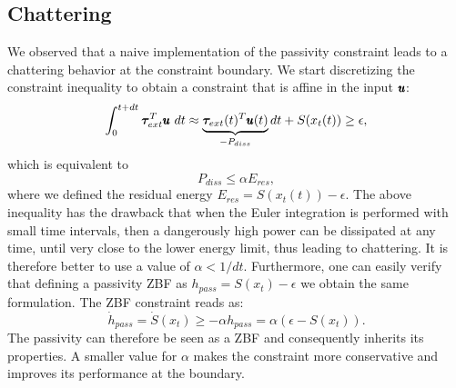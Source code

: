 \subsection{Chattering}
We observed that a naive implementation of the passivity constraint leads to a chattering behavior at the constraint boundary. We start discretizing the constraint inequality to obtain a constraint that is affine in the input $\pmb{u}$:
\begin{equation*}
    \int_{0}^{t + dt} \boldsymbol{\tau}_{ext}^T \pmb{u} \ dt \approx \underbrace{\boldsymbol{\tau}_{ext}(t)^T \pmb{u}(t) }_{-P_{diss}}dt + S(x_t(t)) \geq \epsilon,
\end{equation*}
which is equivalent to 
\begin{equation} \label{eq:passivity_simple}
    P_{diss} \leq \alpha E_{res},
\end{equation}
where we defined the residual energy $E_{res} = S(x_t(t))-\epsilon$. The above inequality has the drawback that when the Euler integration is performed with small time intervals, then a dangerously high power can be dissipated at any time, until very close to the lower energy limit, thus leading to chattering. It is therefore better to use a value of $\alpha < 1/dt$. Furthermore, one can easily verify that defining a passivity ZBF as $h_{pass} = S(x_t) - \epsilon$ we obtain the same formulation. The ZBF constraint reads as:
\begin{equation*}
    \dot{h}_{pass} = \dot{S}(x_t) \geq -\alpha h_{pass}
     =\alpha (\epsilon - S(x_t)).
\end{equation*}
The passivity can therefore be seen as a ZBF and consequently inherits its properties. A smaller value for $\alpha$ makes the constraint more conservative and improves its performance at the boundary. 

